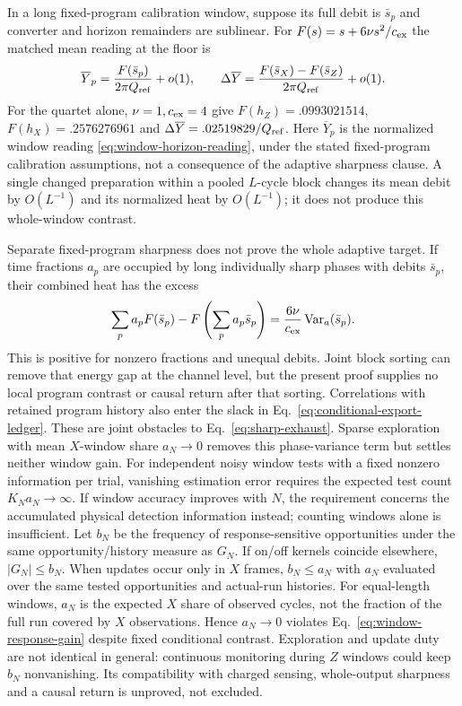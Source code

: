 \documentclass[12pt,a4paper]{article}
\begin{document}
In a long fixed-program calibration window, suppose its full debit is
$\bar s_p$ and converter and horizon remainders are sublinear.
For $F(s)=s+6\nu s^2/c_{\rm ex}$ the matched mean reading at the floor is
\begin{equation}\label{eq:pointer-gain}
 \overline Y_p=\frac{F(\bar s_p)}{2\pi Q_{\rm ref}}+o(1),\qquad
 \Delta\overline Y=\frac{F(\bar s_X)-F(\bar s_Z)}{2\pi Q_{\rm ref}}+o(1).
\end{equation}
For the quartet alone, $\nu=1,c_{\rm ex}=4$ give
$F(h_Z)=.0993021514$, $F(h_X)=.2576276961$ and
$\Delta\overline Y=.02519829/Q_{\rm ref}$.
Here $\overline Y_p$ is the normalized window reading
\eqref{eq:window-horizon-reading}, under the stated fixed-program
calibration assumptions, not a consequence of the adaptive sharpness
clause. A single changed preparation within a pooled $L$-cycle block
changes its mean debit by $O(L^{-1})$ and its normalized heat by
$O(L^{-1})$; it does not produce this whole-window contrast.

Separate fixed-program sharpness does not prove the whole adaptive
target. If time fractions $a_p$ are occupied by long individually sharp
phases with debits $\bar s_p$, their combined heat has the excess
\begin{equation}\label{eq:adaptive-jensen-gap}
 \sum_pa_pF(\bar s_p)-F\left(\sum_pa_p\bar s_p\right)
 =\frac{6\nu}{c_{\rm ex}}\operatorname{Var}_a(\bar s_p).
\end{equation}
This is positive for nonzero fractions and unequal debits. Joint block
sorting can remove that energy gap at the channel level, but the present
proof supplies no local program contrast or causal return after that
sorting. Correlations with retained program history also enter the
slack in Eq.~\eqref{eq:conditional-export-ledger}. These are joint
obstacles to Eq.~\eqref{eq:sharp-exhaust}. Sparse exploration with mean $X$-window share $a_N\to0$ removes this
phase-variance term but settles neither window gain. For independent
noisy window tests with a fixed nonzero information per trial, vanishing
estimation error requires the expected test count $K_Na_N\to\infty$. If window accuracy improves
with $N$, the requirement concerns the accumulated physical detection
information instead; counting windows alone is insufficient.
Let $b_N$ be the frequency of response-sensitive opportunities under
the same opportunity/history measure as $G_N$. If on/off kernels
coincide elsewhere, $|G_N|\le b_N$. When updates occur only in $X$
frames, $b_N\le a_N$ with $a_N$ evaluated over the same tested
opportunities and actual-run histories. For equal-length windows,
$a_N$ is the expected $X$ share of observed cycles, not the fraction
of the full run covered by $X$ observations. Hence $a_N\to0$ violates
Eq.~\eqref{eq:window-response-gain} despite fixed conditional contrast.
Exploration and update duty are not
identical in general: continuous monitoring during $Z$ windows could
keep $b_N$ nonvanishing. Its compatibility with charged sensing,
whole-output sharpness and a causal return is unproved, not excluded.
\end{document}
